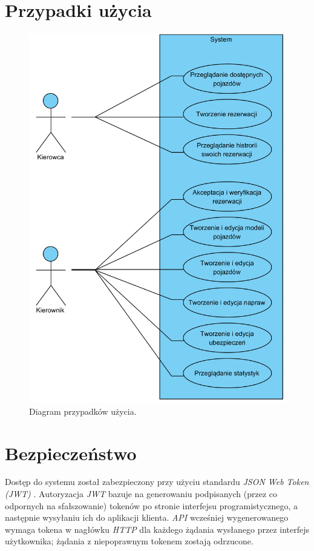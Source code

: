 \documentclass[eng,printmode,openany]{mgr}
\begin{document}
	\newpage
	\section{Przypadki użycia}	
	\begin{figure}[H]
		\centering
		\includegraphics[width=\textwidth]{images/use_case_1.png}
		\caption{Diagram przypadków użycia.}
	\end{figure}
	
	\newpage
	\section{Bezpieczeństwo}
	Dostęp do systemu został zabezpieczony przy użyciu standardu \textit{JSON Web Token (JWT)} \cite{jwt}. Autoryzacja \textit{JWT} bazuje na generowaniu podpisanych (przez co odpornych na sfałszowanie) tokenów po stronie interfejsu programistycznego, a następnie wysyłaniu ich do aplikacji klienta. \textit{API} wcześniej wygenerowanego wymaga tokena w nagłówku \textit{HTTP} dla każdego żądania wysłanego przez interfejs użytkownika; żądania z niepoprawnym tokenem zostają odrzucone.
	
\end{document}
